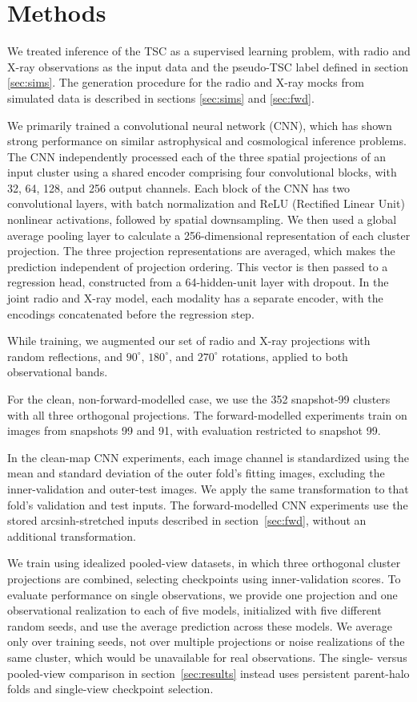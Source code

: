 \section{Methods}
\label{sec:methods}
We treated inference of the TSC as a supervised learning problem, with radio and X-ray observations as the input data and the pseudo-TSC label defined in section \ref{sec:sims}.
The generation procedure for the radio and X-ray mocks from simulated data is described in sections \ref{sec:sims} and \ref{sec:fwd}.

We primarily trained a convolutional neural network (CNN), which has shown strong performance on similar astrophysical and cosmological inference problems.
The CNN independently processed each of the three spatial projections of an input cluster using a shared encoder comprising four convolutional blocks, with 32, 64, 128, and 256 output channels.
Each block of the CNN has two convolutional layers, with batch normalization and ReLU (Rectified Linear Unit) nonlinear activations, followed by spatial downsampling.
We then used a global average pooling layer to calculate a 256-dimensional representation of each cluster projection.
The three projection representations are averaged, which makes the prediction independent of projection ordering.
This vector is then passed to a regression head, constructed from a 64-hidden-unit layer with dropout.
In the joint radio and X-ray model, each modality has a separate encoder, with the encodings concatenated before the regression step.

While training, we augmented our set of radio and X-ray projections with random reflections, and $90^\circ$, $180^\circ$, and $270^\circ$ rotations, applied to both observational bands.

For the clean, non-forward-modelled case, we use the 352 snapshot-99 clusters with all three orthogonal projections.
The forward-modelled experiments train on images from snapshots 99 and 91, with evaluation restricted to snapshot 99.

In the clean-map CNN experiments, each image channel is standardized using the mean and standard deviation of the outer fold's fitting images, excluding the inner-validation and outer-test images.
We apply the same transformation to that fold's validation and test inputs.
The forward-modelled CNN experiments use the stored arcsinh-stretched inputs described in section~\ref{sec:fwd}, without an additional transformation.

We train using idealized pooled-view datasets, in which three orthogonal cluster projections are combined, selecting checkpoints using inner-validation scores.
To evaluate performance on single observations, we provide one projection and one observational realization to each of five models, initialized with five different random seeds, and use the average prediction across these models.
We average only over training seeds, not over multiple projections or noise realizations of the same cluster, which would be unavailable for real observations.
The single- versus pooled-view comparison in section~\ref{sec:results} instead uses persistent parent-halo folds and single-view checkpoint selection.

